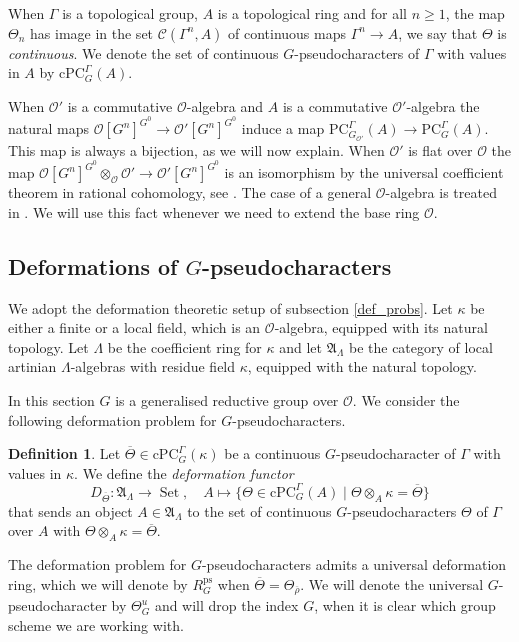 \documentclass{amsart}
\theoremstyle{definition}
\newtheorem{defi}[prop]{Definition}
\theoremstyle{remark}
\DeclareMathOperator{\Set}{Set}
\newcommand{\Aa}{\mathfrak A}
\newcommand{\OO}{\mathcal O}
\newcommand{\rhobar}{\overline{\rho}}
\newcommand{\ps}{\mathrm{ps}}
\newcommand{\RpsG}{R^{\ps}_G}
\newcommand{\PC}{\mathrm{PC}}
\newcommand{\cPC}{\mathrm{cPC}}
\newcommand{\Thetabar}{\overline{\Theta}}
\newcommand{\Cont}{\mathcal{C}}
\begin{document}
When $\Gamma$ is a topological group, $A$ is a topological ring and for all $n \geq 1$, the map $\Theta_n$ has image in the set $\Cont(\Gamma^n, A)$ of continuous maps $\Gamma^n \to A$, we say that $\Theta$ is \emph{continuous}. We denote the set of continuous $G$-pseudocharacters of $\Gamma$ with values in $A$ by $\cPC_G^{\Gamma}(A)$.

When $\OO'$ is a commutative $\OO$-algebra and $A$ is a commutative $\OO'$-algebra the natural maps $\OO[G^n]^{G^0} \to \OO'[G^n]^{G^0}$ induce a map $\PC_{G_{\OO'}}^{\Gamma}(A)\to \PC_G^{\Gamma}(A)$. This map is always a bijection, as we will now explain. When $\OO'$ is flat over $\OO$ the map $\OO[G^n]^{G^0} \otimes_{\OO} \OO' \to \OO'[G^n]^{G^0}$ is an isomorphism by the universal coefficient theorem in rational cohomology, see \cite[Proposition I.4.18 (a)]{Jantzen}. The case of a general $\OO$-algebra is treated in \cite[Proposition 3.22]{quast}. We will use this fact whenever we need to extend the base ring $\OO$.

\subsection{\texorpdfstring{Deformations of $G$-pseudocharacters}{Deformations of G-pseudocharacters}}\label{sec_def_GPC}
We adopt the deformation theoretic setup of subsection \ref{def_probs}.
Let $\kappa$ be either a finite or a local field, which is an $\OO$-algebra, 
equipped with its natural topology. Let $\Lambda$ be the coefficient ring for $\kappa$ and let $\Aa_{\Lambda}$ be the category of local artinian $\Lambda$-algebras with residue field $\kappa$, equipped with the natural topology.  

In this section $G$ is a generalised reductive group over $\OO$.
We consider the following deformation problem for $G$-pseudocharacters.

\begin{defi} \label{pseudodeffunctor} Let $\overline{\Theta} \in \cPC^{\Gamma}_G(\kappa)$ be a continuous $G$-pseudocharacter of $\Gamma$ with values in $\kappa$. We define the \emph{deformation functor}
$$    D_{\overline{\Theta}} : \Aa_{\Lambda} \to \Set, \quad 
    A \mapsto \{\Theta \in \cPC_G^{\Gamma}(A) \mid \Theta \otimes_A \kappa = \overline{\Theta}\}$$
that sends an object $A \in \Aa_{\Lambda}$ to the set of continuous $G$-pseudocharacters $\Theta$ of $\Gamma$ over $A$ with $\Theta \otimes_A \kappa = \overline{\Theta}$.
\end{defi}

The deformation problem for $G$-pseudocharacters admits a universal deformation ring, which we will denote by $\RpsG$ when $\Thetabar = \Theta_{\rhobar}$. We will denote the universal $G$-pseudocharacter by $\Theta^u_G$ and will drop the index $G$, when it is clear which group scheme we are working with.
\end{document}
